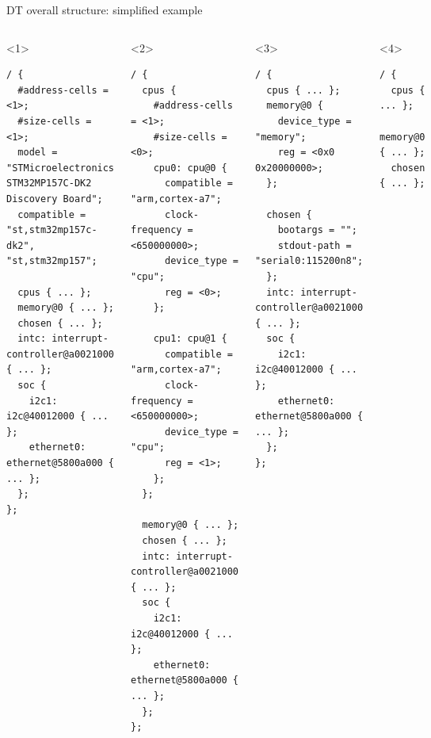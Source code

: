 \begin{frame}[fragile]{DT overall structure: simplified example}
  \begin{columns}
    \begin{onlyenv}<1>
      \begin{block}{}
\begin{verbatim}
/ {
  #address-cells = <1>;
  #size-cells = <1>;
  model = "STMicroelectronics STM32MP157C-DK2 Discovery Board";
  compatible = "st,stm32mp157c-dk2", "st,stm32mp157";

  cpus { ... };
  memory@0 { ... };
  chosen { ... };
  intc: interrupt-controller@a0021000 { ... };
  soc {
    i2c1: i2c@40012000 { ... };
    ethernet0: ethernet@5800a000 { ... };
  };
};
\end{verbatim}
      \end{block}
    \end{onlyenv}
    \begin{onlyenv}<2>
      \begin{block}{}
\begin{verbatim}
/ {
  cpus {
    #address-cells = <1>;
    #size-cells = <0>;
    cpu0: cpu@0 {
      compatible = "arm,cortex-a7";
      clock-frequency = <650000000>;
      device_type = "cpu";
      reg = <0>;
    };

    cpu1: cpu@1 {
      compatible = "arm,cortex-a7";
      clock-frequency = <650000000>;
      device_type = "cpu";
      reg = <1>;
    };
  };

  memory@0 { ... };
  chosen { ... };
  intc: interrupt-controller@a0021000 { ... };
  soc {
    i2c1: i2c@40012000 { ... };
    ethernet0: ethernet@5800a000 { ... };
  };
};
\end{verbatim}
      \end{block}
    \end{onlyenv}
    \begin{onlyenv}<3>
      \begin{block}{}
\begin{verbatim}
/ {
  cpus { ... };
  memory@0 {
    device_type = "memory";
    reg = <0x0 0x20000000>;
  };

  chosen {
    bootargs = "";
    stdout-path = "serial0:115200n8";
  };
  intc: interrupt-controller@a0021000 { ... };
  soc {
    i2c1: i2c@40012000 { ... };
    ethernet0: ethernet@5800a000 { ... };
  };
};
\end{verbatim}
      \end{block}
    \end{onlyenv}
    \begin{onlyenv}<4>
      \begin{block}{}
\begin{verbatim}
/ {
  cpus { ... };
  memory@0 { ... };
  chosen { ... };


\end{verbatim}
\end{block}
\end{onlyenv}
\end{columns}
\end{frame}
